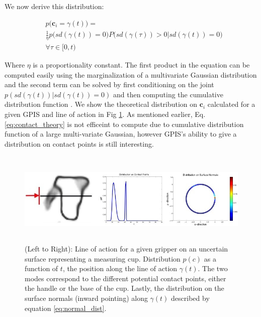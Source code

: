 \documentclass[letterpaper, 10 pt, conference]{ieeeconf}  %
\begin{document}
We now derive this distribution: 

\vspace{-2ex}
\begin{align}
 & p\big(\textbf{c}_i = \gamma(t)\big) = \label{eq:contact_theory} \\
  & \frac{1}{\eta} p\big(sd(\gamma(t)) = 0\big)P\big(sd(\gamma(\tau)) > 0 | sd(\gamma(t)) = 0\big) \\
  & \forall \tau \in [0,t)
\end{align}


Where $\eta$ is a proportionality constant. The first product in the equation can be computed easily using the marginalization of a multivariate Gaussian distribution and the second term can be solved by first conditioning on the joint $p(sd(\gamma(t))|sd(\gamma(t)) = 0)$ and then computing the cumulative distribution function  \cite{petersen2008matrix}.  We show the theoretical distribution on $\textbf{c}_i$ calculated for a given GPIS and line of action in Fig \ref{fig:GraspDist}. As mentioned earlier, Eq. \ref{eq:contact_theory} is not efficeint to compute due to cumulative distribution function of a large multi-variate Gaussian, however GPIS's ability to give a distribution on contact points is still interesting. 


\begin{figure}[ht!]
\centering
\includegraphics[width = 17cm, height = 4.5cm]{figures/Slide04.jpg}
\caption{ \footnotesize (Left to Right): Line of action for a given gripper on an uncertain surface representing a measuring cup. Distribution $p(c)$ as a function of $t$, the position along the line of action $\gamma(t)$. The two modes correspond to the different potential contact points, either the handle or the base of the cup. Lastly, the distribution on the surface normals (inward pointing) along $\gamma(t)$ described by equation \ref{eq:normal_dist}. }
\vspace*{-10pt}
\label{fig:GraspDist}
\end{figure}
\end{document}

